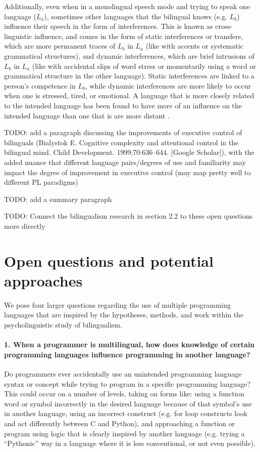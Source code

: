 \documentclass[a4paper,UKenglish,cleveref, autoref]{oasics-v2019}
\begin{document}
Additionally, even when in a monolingual speech mode and trying to speak one language ($L_a$), sometimes other languages that the bilingual knows (e.g. $L_b$) influence their speech in the form of interferences. This is known as cross-linguistic influence, and comes in the form of static interferences or transfers, which are more permanent traces of $L_b$ in $L_a$ (like with accents or systematic grammatical structures), and dynamic interferences, which are brief intrusions of $L_b$ in $L_a$ (like with accidental slips of word stress or momentarily using a word or grammatical structure in the other language). Static interferences are linked to a person’s competence in $L_b$, while dynamic interferences are more likely to occur when one is stressed, tired, or emotional. A language that is more closely related to the intended language has been found to have more of an influence on the intended language than one that is are more distant \cite{pl0011}. 

TODO: add a paragraph discussing the improvements of executive control of bilinguals (Bialystok E. Cognitive complexity and attentional control in the bilingual mind. Child Development. 1999;70:636–644. [Google Scholar]), with the added nuance that different language pairs/degrees of use and familiarity may impact the degree of improvement in executive control (may map pretty well to different PL paradigms) 

TODO: add a summary paragraph

TODO: Connect the bilingualism research in section 2.2 to these open questions more directly 

\section{Open questions and potential approaches}
We pose four larger questions regarding the use of multiple programming languages that are inspired by the hypotheses, methods, and work within the psycholinguistic study of bilingualism. 
\paragraph*{1. When a programmer is multilingual, how does knowledge of certain programming languages influence programming in another language?}

Do programmers ever accidentally use an unintended programming language syntax or concept while trying to program in a specific programming language? This could occur on a number of levels, taking on forms like: using a function word or symbol incorrectly in the desired language because of that symbol’s use in another language, using an incorrect construct (e.g. for loop constructs look and act differently between C and Python), and approaching a function or program using logic that is clearly inspired by another language (e.g. trying a “Pythonic” way in a language where it is less conventional, or not even possible). 
\end{document}
